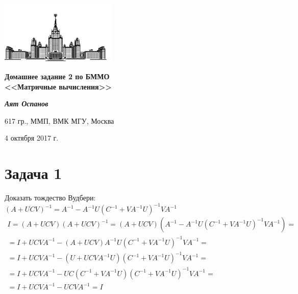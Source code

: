 \documentclass[12pt, a4paper]{article}
\begin{document}
    \begin{singlespace}
    \begin{center}
        \includegraphics[height=3cm]{msu.png}

        {\large\textbf{Домашнее задание 2 по БММО\\
        <<Матричные вычисления>>}\\}

        \vspace{0.3cm}

        \textit{\textbf{Аят Оспанов}}

        617 гр., ММП, ВМК МГУ, Москва

        4 октября 2017 г.
    \end{center}
    \end{singlespace}

    \section*{Задача 1}
    Доказать тождество Вудбери: $(A + UCV)^{-1} = A^{-1} - A^{-1}U(C^{-1} + VA^{-1}U)^{-1}VA^{-1}$
    \begin{gather*}
        I = (A + UCV)(A + UCV)^{-1} = (A + UCV)(A^{-1} - A^{-1}U(C^{-1} + VA^{-1}U)^{-1}VA^{-1}) =\\
        = I + UCVA^{-1} - (A + UCV)A^{-1}U(C^{-1} + VA^{-1}U)^{-1}VA^{-1} = \\
        = I + UCVA^{-1} - (U + UCVA^{-1}U)(C^{-1} + VA^{-1}U)^{-1}VA^{-1} =\\
        = I + UCVA^{-1} - UC(C^{-1} + VA^{-1}U)(C^{-1} + VA^{-1}U)^{-1}VA^{-1} =\\
        = I + UCVA^{-1} - UCVA^{-1} = I
    \end{gather*}
\end{document}
